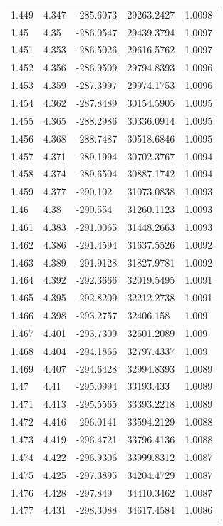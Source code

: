 \begin{tabular}{lllll}
1.449 & 4.347 & -285.6073 & 29263.2427 & 1.0098 \\
1.45 & 4.35 & -286.0547 & 29439.3794 & 1.0097 \\
1.451 & 4.353 & -286.5026 & 29616.5762 & 1.0097 \\
1.452 & 4.356 & -286.9509 & 29794.8393 & 1.0096 \\
1.453 & 4.359 & -287.3997 & 29974.1753 & 1.0096 \\
1.454 & 4.362 & -287.8489 & 30154.5905 & 1.0095 \\
1.455 & 4.365 & -288.2986 & 30336.0914 & 1.0095 \\
1.456 & 4.368 & -288.7487 & 30518.6846 & 1.0095 \\
1.457 & 4.371 & -289.1994 & 30702.3767 & 1.0094 \\
1.458 & 4.374 & -289.6504 & 30887.1742 & 1.0094 \\
1.459 & 4.377 & -290.102 & 31073.0838 & 1.0093 \\
1.46 & 4.38 & -290.554 & 31260.1123 & 1.0093 \\
1.461 & 4.383 & -291.0065 & 31448.2663 & 1.0093 \\
1.462 & 4.386 & -291.4594 & 31637.5526 & 1.0092 \\
1.463 & 4.389 & -291.9128 & 31827.9781 & 1.0092 \\
1.464 & 4.392 & -292.3666 & 32019.5495 & 1.0091 \\
1.465 & 4.395 & -292.8209 & 32212.2738 & 1.0091 \\
1.466 & 4.398 & -293.2757 & 32406.158 & 1.009 \\
1.467 & 4.401 & -293.7309 & 32601.2089 & 1.009 \\
1.468 & 4.404 & -294.1866 & 32797.4337 & 1.009 \\
1.469 & 4.407 & -294.6428 & 32994.8393 & 1.0089 \\
1.47 & 4.41 & -295.0994 & 33193.433 & 1.0089 \\
1.471 & 4.413 & -295.5565 & 33393.2218 & 1.0089 \\
1.472 & 4.416 & -296.0141 & 33594.2129 & 1.0088 \\
1.473 & 4.419 & -296.4721 & 33796.4136 & 1.0088 \\
1.474 & 4.422 & -296.9306 & 33999.8312 & 1.0087 \\
1.475 & 4.425 & -297.3895 & 34204.4729 & 1.0087 \\
1.476 & 4.428 & -297.849 & 34410.3462 & 1.0087 \\
1.477 & 4.431 & -298.3088 & 34617.4584 & 1.0086 \\

\end{tabular}
